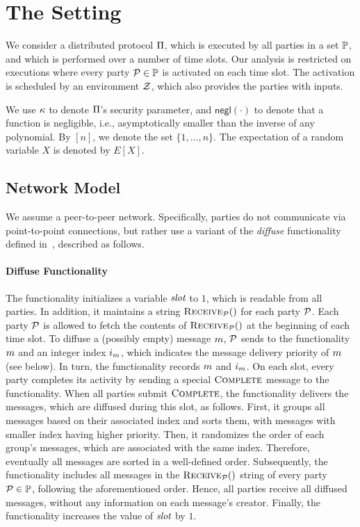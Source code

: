 \section{The Setting}

We consider a distributed protocol $\Pi$, which is executed by all parties in
a set $\mathbb{P}$, and which is performed over a number of time slots. Our
analysis is restricted on executions where every party $\mathcal{P} \in \mathbb{P}$
is activated on each time slot. The activation is scheduled by an environment
$\mathcal{Z}$, which also provides the parties with inputs.

We use $\kappa$ to denote $\Pi$'s security parameter, and
$\mathsf{negl}(\cdot)$ to denote that a function is negligible, i.e.,
asymptotically smaller than the inverse of any polynomial. By $[n]$, we denote
the set $\{1,\ldots,n\}$. The expectation of a random variable $X$ is denoted
by $E[X]$.

\subsection{Network Model}\label{sec:network-model}

We assume a peer-to-peer network. Specifically, parties do not communicate via
point-to-point connections, but rather use a variant of the \emph{diffuse}
functionality defined in~\cite{EC:GarKiaLeo15}, described as follows.

\paragraph{Diffuse Functionality}\label{par:diffuse}
The functionality initializes a variable $\emph{slot}$ to $1$, which is
readable from all parties. In addition, it maintains a string
$\textsc{Receive}_{\mathcal{P}}()$ for each party $\mathcal{P}$. Each party $\mathcal{P}$ is
allowed to fetch the contents of $\textsc{Receive}_{\mathcal{P}}()$ at the beginning
of each time slot. To diffuse a (possibly empty) message $m$, $\mathcal{P}$
sends to the functionality $m$ and an integer index $i_m$, which
indicates the message delivery priority of $m$ (see below). In turn,
the functionality records $m$ and $i_m$. On each slot, every party completes its
activity by sending a special $\textsc{Complete}$ message to the functionality.
When all parties submit $\textsc{Complete}$, the functionality delivers the
messages, which are diffused during this slot, as follows.  First, it groups
all messages based on their associated index and sorts them, with messages with
smaller index having higher priority. Then, it randomizes the order of each
group's messages, \ie which are associated with the same index.  Therefore,
eventually all messages are sorted in a well-defined order.  Subsequently, the
functionality includes all messages in the $\textsc{Receive}_{\mathcal{P}}()$ string
of every party $\mathcal{P} \in \mathbb{P}$, following the aforementioned order.
Hence, all parties receive all diffused messages, without any information
on each message's creator. Finally, the functionality increases the value of $\emph{slot}$
by $1$.

